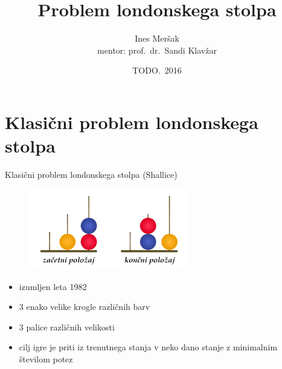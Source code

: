 \documentclass[dvipsnames]{beamer}
\title{Problem londonskega stolpa}
\author[Ines Meršak]{Ines Meršak \\[5px] mentor: prof.~dr.~Sandi Klavžar}
\date{TODO.~2016}
\begin{document}
    
\begin{frame}[plain]
    \titlepage
\end{frame}


\section{Klasični problem londonskega stolpa}
\begin{frame}{Klasični problem londonskega stolpa (Shallice)}
    \begin{figure}
        \centering
        \includegraphics[height=100pt]{../img/london-tower.png}
    \end{figure}
    \begin{itemize}
        \item izumljen leta 1982
        \item 3 enako velike krogle različnih barv
        \item 3 palice različnih velikosti
        \item cilj igre je priti iz trenutnega stanja v neko dano stanje z minimalnim številom potez
    \end{itemize}
\end{frame}
\end{document}
